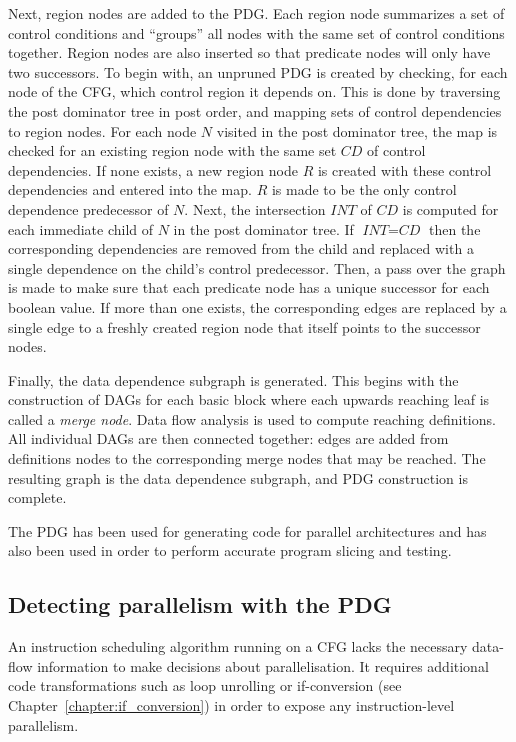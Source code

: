Next, region nodes are added to the PDG. 
Each region node summarizes a set of control conditions and ``groups'' all nodes with the same set of control conditions together. 
Region nodes are also inserted so that predicate nodes will only have two successors. 
To begin with, an unpruned PDG is created by checking, for each node of the CFG, which control region it depends on. 
This is done by traversing the post dominator tree in post order, and mapping sets of control dependencies to region nodes. 
For each node $N$ visited in the post dominator tree, the map is checked for an existing region node with the same set $\textit{CD}$ of control dependencies. 
If none exists, a new region node $R$ is created with these control dependencies and entered into the map. 
$R$ is made to be the only control dependence predecessor of $N$. 
Next, the intersection $\textit{INT}$ of $\textit{CD}$ is computed for each immediate child of $N$ in the post dominator tree. 
If $\textit{INT}=\textit{CD}$ then the corresponding dependencies are removed from the child and replaced with a single dependence on the child's control predecessor. 
Then, a pass over the graph is made to make sure that each predicate node has a unique successor for each boolean value. 
If more than one exists, the corresponding edges are replaced by a single edge to a freshly created region node that itself points to the successor nodes.

Finally, the data dependence subgraph is generated. This begins with the construction of DAGs for each basic block where each upwards reaching leaf is called a \textit{merge node}. Data flow analysis is used to compute reaching definitions. All individual DAGs are then connected together: edges are added from definitions nodes to the corresponding merge nodes that may be reached. The resulting graph is the data dependence subgraph, and PDG construction is complete.

The PDG has been used for generating code for parallel architectures and has also been used in order to perform accurate program slicing and testing.

\subsection{Detecting parallelism with the PDG}

An instruction scheduling algorithm running on a CFG lacks the necessary data-flow information to make decisions about parallelisation. It requires additional code transformations such as loop unrolling or if-conversion (see Chapter~\ref{chapter:if_conversion}) in order to expose any instruction-level parallelism.

